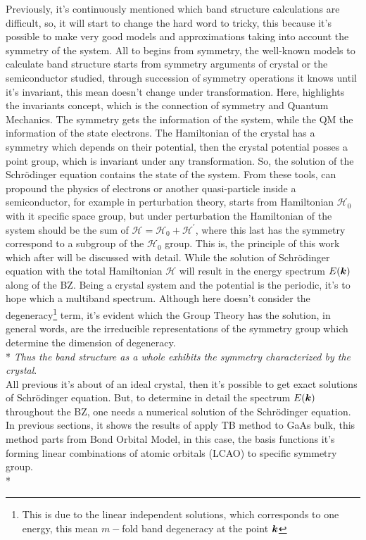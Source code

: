 Previously, it's continuously mentioned which band structure calculations are difficult, so,  it will start to change the hard word to tricky, this because it's possible to make very good models and approximations taking into account the symmetry of the system. All to begins  from symmetry, the well-known models to calculate band structure starts from symmetry arguments of crystal or the semiconductor studied, through succession of  symmetry operations it knows until it's invariant, this mean doesn't change under transformation. 
Here, highlights the invariants concept, which is the connection of symmetry and Quantum Mechanics. The symmetry gets the information of the  system, while the QM the information of the state electrons. The Hamiltonian of the crystal has a symmetry which depends on their potential,  then the crystal potential posses a point group, which is invariant under any transformation. So, the solution of  the Schrödinger equation contains the state of the system. From these tools, can  propound the physics of electrons or another quasi-particle inside a semiconductor, for example in perturbation theory, starts from Hamiltonian $\mathscr{H}_{0}$ with it specific space group, but under perturbation the Hamiltonian of the system should be the sum of $\mathscr{H}=\mathscr{H}_{0}+\mathscr{H}^{\prime}$, where this last has the symmetry correspond to a subgroup of the $\mathscr{H}_{0}$ group.
This is, the principle of this work which after will be discussed with detail. While the solution of Schrödinger equation with the total Hamiltonian $\mathscr{H}$ will result in the energy spectrum $E(\boldsymbol{k})$ along of the \gls{BZ}. Being a crystal system and the potential is the periodic, it's to hope which a multiband spectrum. Although here doesn't consider the degeneracy\footnote{This is due to the  linear independent solutions, which corresponds to one energy, this mean $m-$fold  band degeneracy at the point $\boldsymbol{k}$\cite{bir1974symmetry}} term, it's evident which the Group Theory has the solution, in general words,   are the irreducible representations of the symmetry group which determine the dimension of degeneracy\cite{bir1974symmetry}. \\*
\emph{Thus the band structure as a whole exhibits the symmetry characterized by the crystal}\cite{bir1974symmetry}.
\\
All previous it's about of an ideal crystal, then it's possible to get exact solutions of Schrödinger equation. But, to determine in detail the spectrum $E(\boldsymbol{k})$ throughout the \gls{BZ}, one needs a numerical solution of the Schrödinger equation. In previous sections, it shows the results of apply \gls{TB} method to GaAs bulk, this method parts from Bond Orbital Model\cite{harrison1973bond,vogl1983asemiempirical,slater1954simplified}, in this case, the basis functions it's forming linear combinations of atomic orbitals (LCAO) to specific symmetry group\cite{dresselhaus2007group}. \\*
